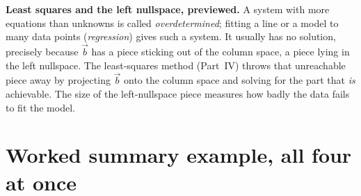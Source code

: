 \begin{applicationbox}
\textbf{Least squares and the left nullspace, previewed.} A system with more equations than
unknowns is called \emph{overdetermined}; fitting a line or a model to many data points
(\emph{regression}) gives such a system. It usually has no solution, precisely because
$\vec{b}$ has a piece sticking out of the column space, a piece lying in the left nullspace. The
least-squares method (Part~IV) throws that unreachable piece away by projecting
$\vec{b}$ onto the column space and solving for the part that \emph{is} achievable. The size of
the left-nullspace piece measures how badly the data fails to fit the model.
\end{applicationbox}

\section{Worked summary example, all four at once}

